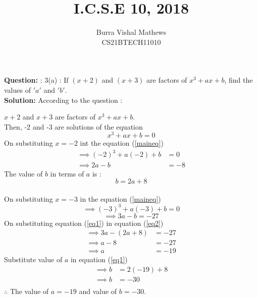\documentclass[journal,12pt,twocolumn]{IEEEtran}
\begin{document}



\providecommand{\brak}[1]{\ensuremath{\left(#1\right)}}


\providecommand{\system}{\overset{\mathcal{H}}{ \longleftrightarrow}}
\newcommand{\question}{\noindent \textbf{Question: }}	
\newcommand{\solution}{\noindent \textbf{Solution: }}

\providecommand{\dec}[2]{\ensuremath{\overset{#1}{\underset{#2}{\gtrless}}}}



\vspace{3cm}
\title{I.C.S.E 10, 2018}

\author{ Burra Vishal Mathews\\CS21BTECH11010}
	


\maketitle
\question : 3(a) : 
 If $(x+2)$ and $(x+3)$ are factors of $x^3+ax+b$, find the values of $'a'$ and $'b'$.\\


\solution
    According to the question :

    $x+2$ and $x+3$ are factors of $x^3+ax+b$.\\
    Then, -2 and -3 are solutions of the equation \\
    \begin{equation}
    \label{maineq}
        x^3+ax+b=0
    \end{equation}
    On substituting $x=-2$  int the equation (\ref{maineq})
    \begin{align*}
        \implies \brak{-2}^3+a\brak{-2}+b&=0\\ 
        \implies 2a-b&=-8
    \end{align*}
    The value of $b$ in terms of $a$ is :
    \begin{equation}
    \label{eq1}
        b=2a+8
    \end{equation}
    \\
    On substituting $x=-3$ in the equation (\ref{maineq})$$\implies \brak{-3}^3+a\brak{-3}+b=0$$
    \begin{equation}
    \label{eq2}
        \implies 3a-b=-27
    \end{equation}
    On substituting equation (\ref{eq1}) in equation (\ref{eq2})
    \begin{align*}
        \implies 3a-\brak{2a+8}&=-27\\
        \implies a-8&=-27\\
        \implies a&=-19
    \end{align*}
    Substitute value of $a$ in equation (\ref{eq1}) 
    \begin{align*}
    \implies b&=2\brak{-19}+8\\
    \implies b&=-30\\
    \end{align*}
    $ \therefore $ The value of $a = -19$ and value of $b = -30$.\\
    
\end{document}
